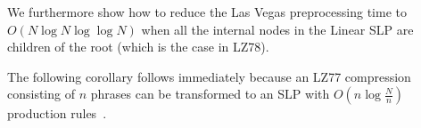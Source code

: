 	
	

\noindent We furthermore show how to reduce the Las Vegas preprocessing time to $O(N\log N\log\log N)$ when all the internal nodes in the Linear SLP are children of the root (which is the case in LZ78).

The following corollary follows immediately because an LZ77 compression~\cite{lz77} consisting of $n$ phrases can be transformed to an SLP with $O(n\log\frac{N}{n})$ production rules~\cite{charikar2005smallest,rytter2003application}.

